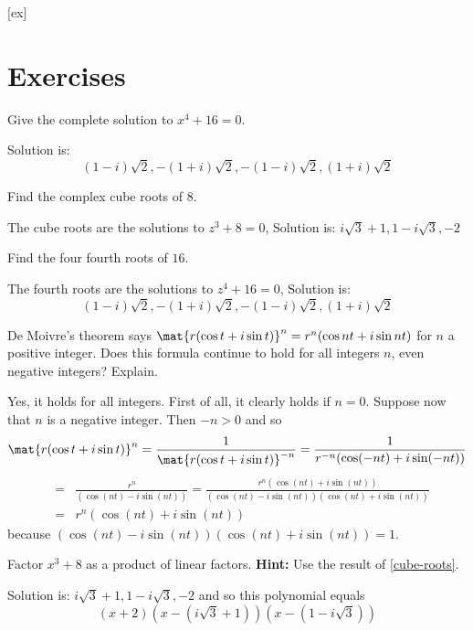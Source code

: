 [ex]
\section*{Exercises}


\begin{ex} Give the complete solution to $x^{4}+16=0$. 
\begin{sol}
 Solution is:
\[
(1-i) \sqrt{2},-(1+i) \sqrt{2},-(1-i)
\sqrt{2},(1+i) \sqrt{2}
\]
\end{sol}
\end{ex}

\begin{ex} \label{cube-roots} Find the complex cube roots of $8$.
\begin{sol}
The cube roots are the solutions to $%
z^{3}+8=0$, Solution is: $i\sqrt{3} +1,1-i\sqrt{3},-2$
\end{sol}
\end{ex}

\begin{ex} \label{cube-roots2} Find the four fourth roots of $16$.  
\begin{sol}
The fourth roots are
the solutions to $z^{4}+16=0$, Solution is:
\[
(1-i) \sqrt{2},-(1+i) \sqrt{2},-(1-i)
\sqrt{2},(1+i)\sqrt{2}
\]
\end{sol}
\end{ex}

\begin{ex} \label{exer-complex1}De Moivre's theorem says $\mat{r(\cos
t+i\sin t)} ^{n}=r^{n}(\cos nt+i\sin nt) $ for $n$
a positive integer. Does this formula continue to hold for all integers $n$,
even negative integers? Explain.  
\begin{sol}
Yes, it holds for all integers. First of
all, it clearly holds if $n=0$. Suppose now that $n$ is a negative integer.
Then $-n>0$ and so
\[
\mat{r(\cos t+i\sin t)} ^{n}=\frac{1}{\mat{r(
\cos t+i\sin t)} ^{-n}}=\frac{1}{r^{-n}(\cos (
-nt) +i\sin (-nt)) }
\]
\begin{eqnarray*}
&=&\frac{r^{n}}{(\cos (nt) -i\sin (nt))
}=\frac{r^{n}(\cos (nt) +i\sin (nt)) }{
(\cos (nt) -i\sin (nt)) (\cos
(nt) +i\sin (nt)) } \\
&=&r^{n}(\cos (nt) +i\sin (nt))
\end{eqnarray*}
because $(\cos (nt) -i\sin (nt)) (
\cos (nt) +i\sin (nt)) =1$.
\end{sol}
\end{ex}

\begin{ex} Factor $x^{3}+8$ as a product of linear factors. \textbf{Hint:} Use the result of {\eqref{cube-roots}}.
\begin{sol}
Solution
is: $i\sqrt{3}+1,1-i\sqrt{3},-2$ and so this polynomial equals
\[
(x+2) (x-(i\sqrt{3}+1)) (x-(
1-i\sqrt{3}))
\]
\end{sol}
\end{ex}


